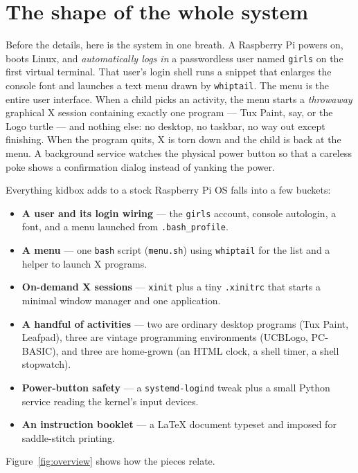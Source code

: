 \documentclass[11pt,oneside]{article}
\newcommand{\file}[1]{\textcolor{kbteal}{\texttt{#1}}}
\begin{document}
\section{The shape of the whole system}

Before the details, here is the system in one breath. A Raspberry Pi powers
on, boots Linux, and \emph{automatically logs in} a passwordless user named
\texttt{girls} on the first virtual terminal. That user's login shell runs a
snippet that enlarges the console font and launches a text menu drawn by
\texttt{whiptail}. The menu is the entire user interface. When a child picks an
activity, the menu starts a \emph{throwaway} graphical X session containing
exactly one program --- Tux Paint, say, or the Logo turtle --- and nothing
else: no desktop, no taskbar, no way out except finishing. When the program
quits, X is torn down and the child is back at the menu. A background service
watches the physical power button so that a careless poke shows a confirmation
dialog instead of yanking the power.

Everything kidbox adds to a stock Raspberry Pi OS falls into a few buckets:

\begin{itemize}
\item \textbf{A user and its login wiring} --- the \texttt{girls} account, console
autologin, a font, and a menu launched from \file{.bash\_profile}.
\item \textbf{A menu} --- one \texttt{bash} script (\file{menu.sh}) using
\texttt{whiptail} for the list and a helper to launch X programs.
\item \textbf{On-demand X sessions} --- \texttt{xinit} plus a tiny
\file{.xinitrc} that starts a minimal window manager and one application.
\item \textbf{A handful of activities} --- two are ordinary desktop programs
(Tux Paint, Leafpad), three are vintage programming environments (UCBLogo,
PC-BASIC), and three are home-grown (an HTML clock, a shell timer, a shell
stopwatch).
\item \textbf{Power-button safety} --- a \texttt{systemd-logind} tweak plus a
small Python service reading the kernel's input devices.
\item \textbf{An instruction booklet} --- a LaTeX document typeset and imposed
for saddle-stitch printing.
\end{itemize}

Figure~\ref{fig:overview} shows how the pieces relate.
\end{document}
